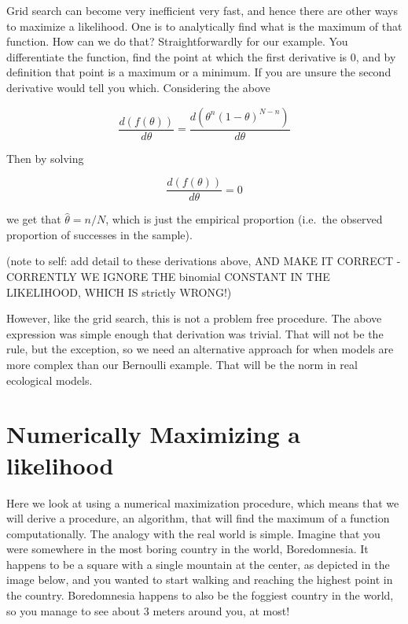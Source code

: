 \documentclass[
]{book}
\begin{document}
Grid search can become very inefficient very fast, and hence there are other ways to maximize a likelihood. One is to analytically find what is the maximum of that function. How can we do that? Straightforwardly for our example. You differentiate the function, find the point at which the first derivative is 0, and by definition that point is a maximum or a minimum. If you are unsure the second derivative would tell you which. Considering the above

\[\frac{d(f(\theta))}{d \theta}=\frac{d(\theta^n (1-\theta)^{N-n})}{d \theta}\]

Then by solving

\[\frac{d(f(\theta))}{d \theta}=0\]

we get that \(\hat \theta = n/N\), which is just the empirical proportion (i.e.~the observed proportion of successes in the sample).

(note to self: add detail to these derivations above, AND MAKE IT CORRECT - CORRENTLY WE IGNORE THE binomial CONSTANT IN THE LIKELIHOOD, WHICH IS strictly WRONG!)

However, like the grid search, this is not a problem free procedure. The above expression was simple enough that derivation was trivial. That will not be the rule, but the exception, so we need an alternative approach for when models are more complex than our Bernoulli example. That will be the norm in real ecological models.

\hypertarget{numerically-maximizing-a-likelihood}{%
\section{Numerically Maximizing a likelihood}\label{numerically-maximizing-a-likelihood}}

Here we look at using a numerical maximization procedure, which means that we will derive a procedure, an algorithm, that will find the maximum of a function computationally. The analogy with the real world is simple. Imagine that you were somewhere in the most boring country in the world, Boredomnesia. It happens to be a square with a single mountain at the center, as depicted in the image below, and you wanted to start walking and reaching the highest point in the country. Boredomnesia happens to also be the foggiest country in the world, so you manage to see about 3 meters around you, at most!
\end{document}

